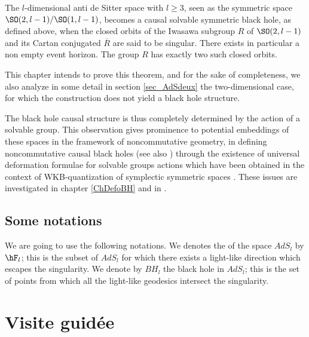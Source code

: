 \begin{theorem}
The $l$-dimensional anti de Sitter space with $l\geq 3$, seen as the symmetric space $\SO(2,l-1)/\SO(1,l-1)$, becomes a causal solvable symmetric black hole, as defined above, when the closed orbits of the Iwasawa subgroup $R$ of $\SO(2,l-1)$ and its Cartan conjugated $\overline{ R }$ are said to be singular. There exists in particular a non empty event horizon. The group $R$ has exactly two such closed orbits. 
\label{ThoLeBut}
 \end{theorem}

This chapter intends to prove this theorem, and for the sake of completeness, we also analyze in some detail in section \ref{sec_AdSdeux} the two-dimensional case, for which the construction does not yield a black hole structure.

The black hole causal structure is thus completely determined by the action of a solvable group.  This observation gives prominence to potential embeddings of these spaces in the framework of noncommutative geometry, in defining noncommutative causal black holes (see also \cite{BDRS}) through the existence of universal deformation formulae for solvable groups actions which have been obtained in the context of WKB-quantization of symplectic symmetric spaces \cite{StrictSolvableSym,Biel-Massar-2}. These issues are investigated in chapter \ref{ChDefoBH} and in \cite{articleBVCS}.


					\subsection{Some notations}

We are going to use the following notations. We denotes the  of the space $AdS_l$ by $\hF_l$; this is the subset of $AdS_l$ for which there exists a light-like direction which escapes the singularity. We denote by $BH_l$ the black hole in $AdS_l$; this is the set of points from which all the light-like geodesics intersect the singularity.



\section{Visite guidée}

